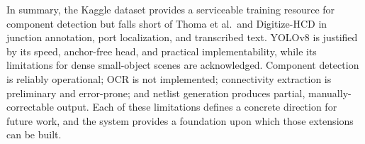 In summary, the Kaggle dataset provides a serviceable training resource for component detection but falls short of Thoma et al.\ and Digitize-HCD in junction annotation, port localization, and transcribed text. YOLOv8 is justified by its speed, anchor-free head, and practical implementability, while its limitations for dense small-object scenes are acknowledged. Component detection is reliably operational; OCR is not implemented; connectivity extraction is preliminary and error-prone; and netlist generation produces partial, manually-correctable output. Each of these limitations defines a concrete direction for future work, and the system provides a foundation upon which those extensions can be built.

